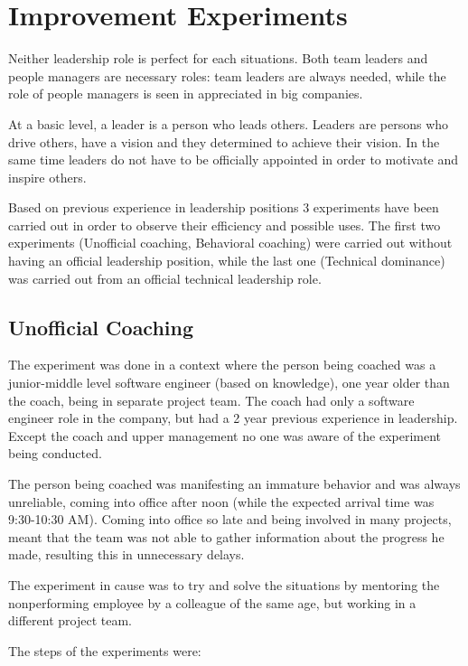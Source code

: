 \chapter{Improvement Experiments}
\label{chapter:improvement}
Neither leadership role is perfect for each situations. Both team leaders and people managers are necessary roles: team leaders are always needed, while the role of people managers is seen in appreciated in big companies.

At a basic level, a leader is a person who leads others. Leaders are persons who drive others, have a vision and they determined to achieve their vision. In the same time leaders do not have to be officially appointed in order to motivate and inspire others.

Based on previous experience in leadership positions 3 experiments have been carried out in order to observe their efficiency and possible uses. The first two experiments (Unofficial coaching, Behavioral coaching) were carried out without having an official leadership position, while the last one (Technical dominance) was carried out from an official technical leadership role.

\section{Unofficial Coaching}
\label{sec:un-coach}

The experiment was done in a context where the person being coached was a junior-middle level software engineer (based on knowledge), one year older than the coach, being in separate project team. The coach had only a software engineer role in the company, but had a 2 year previous experience in leadership. Except the coach and upper management no one was aware of the experiment being conducted.

The person being coached was manifesting an immature behavior and was always unreliable, coming into office after noon (while the expected arrival time was 9:30-10:30 AM). Coming into office so late and being involved in many projects, meant that the team was not able to gather information about the progress he made, resulting this in unnecessary delays. 

The experiment in cause was to try and solve the situations by mentoring the nonperforming employee by a colleague of the same age, but working in a different project team.

The steps of the experiments were:

